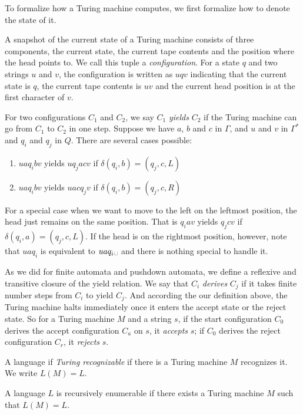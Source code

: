 \documentclass[11pt]{article}
\begin{document}
To formalize how a Turing machine computes, we first formalize how to denote the state of it.

A snapshot of the current state of a Turing machine consists of three components, the current state,
the current tape contents and the position where the head points to. We call this tuple a
\emph{configuration}. For a state $q$ and two strings $u$ and $v$, the configuration is written as
$uqv$ indicating that the current state is $q$, the current tape contents is $uv$ and the current
head position is at the first character of $v$.

For two configurations $C_1$ and $C_2$, we say $C_1$ \emph{yields} $C_2$ if the Turing machine can
go from $C_1$ to $C_2$ in one step. Suppose we have $a$, $b$ and $c$ in $\Gamma$, and $u$ and $v$
in $\Gamma^\ast$ and $q_i$ and $q_j$ in $Q$. There are several cases possible:
\begin{enumerate}
\item $uaq_ibv$ yields $uq_jacv$ if $\delta(q_i,b)=(q_j,c,L)$
\item $uaq_ibv$ yields $uacq_jv$ if $\delta(q_i,b)=(q_j,c,R)$
\end{enumerate}

For a special case when we want to move to the left on the leftmost position, the head just remains
on the same position. That is $q_iav$ yields $q_jcv$ if $\delta(q_i,a)=(q_j,c,L)$. If the head is
on the rightmost position, however, note that $uaq_i$ is equivalent to
$uaq_i\text{\textvisiblespace}$ and there is nothing special to handle it.

As we did for finite automata and pushdown automata, we define a reflexive and transitive closure
of the yield relation. We say that $C_i$ \emph{derives} $C_j$ if it takes finite number steps from
$C_i$ to yield $C_j$. And according the our definition above, the Turing machine halts immediately
once it enters the accept state or the reject state. So for a Turing machine $M$ and a string $s$,
if the start configuration $C_0$ derives the accept configuration $C_a$ on $s$, it \emph{accepts}
$s$; if $C_0$ derives the reject configuration $C_r$, it \emph{rejects} $s$.

\begin{definition}
A language if \emph{Turing recognizable} if there is a Turing machine $M$ recognizes it. We write
$L(M) = L$.
\end{definition}

\begin{definition}
A language $L$ is recursively enumerable if there exists a Turing machine $M$ such that $L(M) = L$.
\end{definition}
\end{document}
